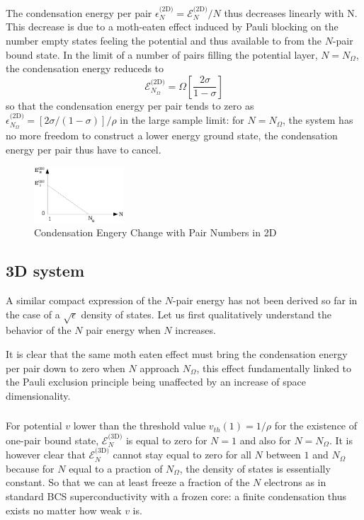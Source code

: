 \documentclass{article}
\newcommand{\td}{{\ensuremath{{\text{(2D)}}}}}
\newcommand{\sd}{{\ensuremath{{\text{(3D)}}}}}
\begin{document}
The condensation energy per pair $\epsilon^\td_N=\mathcal{E}^\td_N/N$ thus decreases linearly with N. This decrease is due to a moth-eaten effect induced by Pauli blocking on the number empty states feeling the potential and thus available to from the $N$-pair bound state.  In the limit of a number of pairs filling the potential layer, $N=N_\Omega$, the condensation energy reduceds to 
\begin{equation}
 \mathcal{E}^\td_{N_\Omega}=\Omega[\frac{2\sigma}{1-\sigma}]
\end{equation}
so that the condensation energy per pair tends to zero as $\epsilon^\td_{N_\Omega}=[2\sigma/(1-\sigma)]/\rho$ in the large sample limit: for $N=N_\Omega$, the system has no more freedom to construct a lower energy ground state, the condensation energy per pair thus have to cancel.  


\begin{figure}[htbp]
	\centering
		\includegraphics[width=0.30\textwidth]{2dCondEnergy.eps}
	\caption{Condensation Engery Change  with Pair Numbers in 2D}
	\label{fig:2dCondEnergy}
\end{figure}



\subsection{3D system}
A similar compact expression of the $N$-pair energy has not been derived so far in the case of a $\sqrt{\epsilon}$ density of states. Let us first qualitatively understand the behavior of the $N$ pair energy when $N$ increases. 

It is clear that the same moth eaten effect must bring the condensation energy per pair down to zero when $N$ approach $N_\Omega$, this effect fundamentally linked to the Pauli exclusion principle being unaffected by an increase of space dimensionality. 

\subsubsection{}
For potential $v$ lower than the threshold value $v_{th}(1)=1/\rho$ for the existence of one-pair bound state, $\mathcal{E}_N^\sd$ is equal to zero for $N=1$ and also for $N=N_\Omega$.  It is however clear that $\mathcal{E}_N^\sd$ cannot stay equal to zero for all $N$ between $1$ and $N_\Omega$ because for $N$ equal to a praction of $N_\Omega$, the density of states is essentially constant.  So that we can at least freeze a fraction of the $N$ electrons as in standard BCS superconductivity with a frozen core: a finite condensation thus exists no matter how weak $v$ is. 
\end{document}
